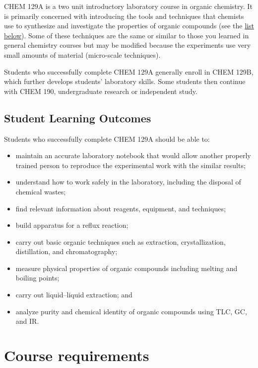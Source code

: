CHEM 129A is a two unit introductory laboratory course in organic
chemistry. It is primarily concerned with introducing the tools and
techniques that chemists use to synthesize and investigate the
properties of organic compounds (see the \protect\hyperlink{slo}{list
below}). Some of these techniques are the same or similar to those you
learned in general chemistry courses but may be modified because the
experiments use very small amounts of material (micro-scale techniques).

Students who successfully complete CHEM 129A generally enroll in CHEM
129B, which further develops students' laboratory skills. Some students
then continue with CHEM 190, undergraduate research or independent
study.

\hypertarget{slo}{%
\subsection{Student Learning Outcomes}\label{slo}}

Students who successfully complete CHEM 129A should be able to:

\begin{itemize}
\tightlist
\item
  maintain an accurate laboratory notebook that would allow another
  properly trained person to reproduce the experimental work with the
  similar results;
\item
  understand how to work safely in the laboratory, including the
  disposal of chemical wastes;
\item
  find relevant information about reagents, equipment, and techniques;
\item
  build apparatus for a reflux reaction;
\item
  carry out basic organic techniques such as extraction,
  crystallization, distillation, and chromatography;
\item
  measure physical properties of organic compounds including melting and
  boiling points;
\item
  carry out liquid--liquid extraction; and
\item
  analyze purity and chemical identity of organic compounds using TLC,
  GC, and IR.
\end{itemize}

\hypertarget{course-requirements}{%
\section{Course requirements}\label{course-requirements}}

